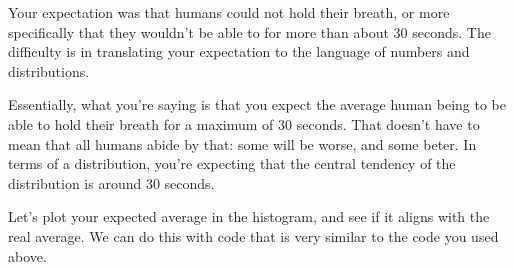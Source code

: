 \documentclass[11pt]{article}
\begin{document}
Your expectation was that humans could not hold their breath, or more
specifically that they wouldn't be able to for more than about 30
seconds. The difficulty is in translating your expectation to the
language of numbers and distributions.

Essentially, what you're saying is that you expect the average human
being to be able to hold their breath for a maximum of 30 seconds. That
doesn't have to mean that all humans abide by that: some will be worse,
and some beter. In terms of a distribution, you're expecting that the
central tendency of the distribution is around 30 seconds.

Let's plot your expected average in the histogram, and see if it aligns
with the real average. We can do this with code that is very similar to
the code you used above.
\end{document}
